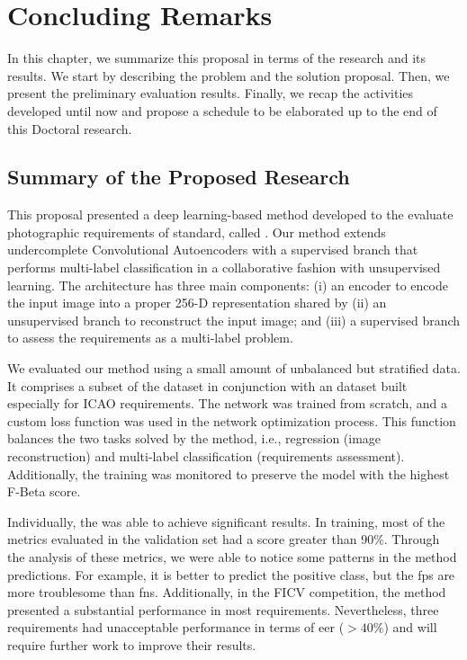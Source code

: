 \section{Concluding Remarks}

In this chapter, we summarize this proposal in terms of the research and its results. We start by describing the problem and the solution proposal. Then, we present the preliminary evaluation results. Finally, we recap the activities developed until now and propose a schedule to be elaborated up to the end of this Doctoral research.

\subsection{Summary of the Proposed Research}

This proposal presented a deep learning-based method developed to the evaluate photographic requirements of \icao standard, called \methodname. Our method extends undercomplete Convolutional Autoencoders with a supervised branch that performs multi-label classification in a collaborative fashion with unsupervised learning. The architecture has three main components: (i) an encoder to encode the input image into a proper 256-D representation shared by (ii) an unsupervised branch to reconstruct the input image; and (iii) a supervised branch to assess the requirements as a multi-label problem. 

We evaluated our method using a small amount of unbalanced but stratified data. It comprises a subset of the \ficvtest dataset in conjunction with an \adhoc dataset built especially for ICAO requirements. The network was trained from scratch, and a custom loss function was used in the network optimization process. This function balances the two tasks solved by the method, i.e., regression (image reconstruction) and multi-label classification (requirements assessment). Additionally, the training was monitored to preserve the model with the highest F-Beta score.

Individually, the \methodname was able to achieve significant results. In training, most of the metrics evaluated in the validation set had a score greater than 90\%. Through the analysis of these metrics, we were able to notice some patterns in the method predictions. For example, it is better to predict the positive class, but the \aclp{fp} are more troublesome than \aclp{fn}. Additionally, in the FICV competition, the method presented a substantial performance in most requirements. Nevertheless, three requirements had unacceptable performance in terms of \acs{eer} ($> 40\%$) and will require further work to improve their results.


